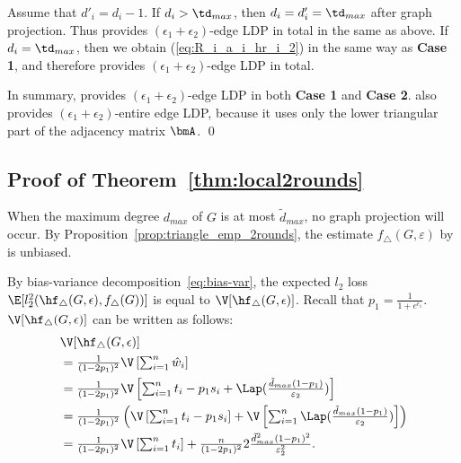 Assume that $d'_i = d_i - 1$. 
If $d_i > \td_{max}$, then $d_i = d'_i = \td_{max}$ after graph projection. 
Thus  provides $(\epsilon_1 + \epsilon_2)$-edge LDP in total in the same as above. 
If $d_i = \td_{max}$, then we obtain (\ref{eq:R_i_a_i_hr_i_2}) in the same way as \textbf{Case 1}, and therefore  provides $(\epsilon_1 + \epsilon_2)$-edge LDP in total.

\smallskip
In summary,  provides $(\epsilon_1 + \epsilon_2)$-edge LDP in both \textbf{Case 1} and \textbf{Case 2}. 
 also provides $(\epsilon_1 + \epsilon_2)$-entire edge LDP, because it uses only the lower triangular part of the adjacency matrix $\bmA$. \qed

\subsection{Proof of Theorem~\ref{thm:local2rounds}}
  When the maximum degree $d_{max}$ of $G$ is at most $\tilde{d}_{max}$, no graph
  projection will occur.
  By Proposition~\ref{prop:triangle_emp_2rounds}, the estimate
  $f_\triangle(G,\varepsilon)$ by  is unbiased.

  By bias-variance
  decomposition~\eqref{eq:bias-var}, the expected $l_2$ loss
  $\E[l_2^2(\hf_\triangle(G, \epsilon), f_\triangle(G))]$ is equal to
  $\V[\hf_\triangle(G,\epsilon)]$.
  Recall that $p_1 = \frac{1}{1+e^{\epsilon_1}}$.
  $\V[\hf_\triangle(G,\epsilon)]$ 
  can be written as follows:
  \begin{align}
    &\V[\hf_\triangle(G,\epsilon)] \\
    &= \textstyle{\frac{1}{(1-2p_1)^2}\V\left[\sum_{i=1}^n
    \hat{w}_i\right]} \nonumber \\
    &= \textstyle{\frac{1}{(1-2p_1)^2}\V\left[\sum_{i=1}^n
    t_i - p_1 s_i +
    \Lap(\frac{\tilde{d}_{max}(1-p_1)}{\varepsilon_2})\right]} \nonumber \\
    &= \textstyle{\frac{1}{(1-2p_1)^2}\left(\V\left[\sum_{i=1}^n
    t_i - p_1 s_i \right] +
    \V\left[\sum_{i=1}^n
    \Lap(\frac{\tilde{d}_{max}(1-p_1)}{\varepsilon_2})\right]\right)} \nonumber \\
    &= \textstyle{\frac{1}{(1-2p_1)^2}\V\left[\sum_{i=1}^n
    t_i \right] + \frac{n}{(1-2p_1)^2}
    2\frac{\tilde{d}_{max}^2(1-p_1)^2}{\varepsilon_2^2}}.\label{eq:local2rounds-var}
  \end{align}

